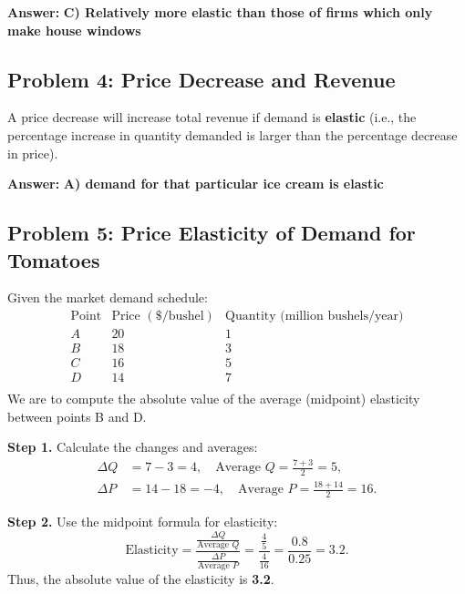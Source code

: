 \documentclass[12pt]{article}
\begin{document}
\textbf{Answer:} \textbf{C) Relatively more elastic than those of firms which only make house windows}

\subsection*{Problem 4: Price Decrease and Revenue}
A price decrease will increase total revenue if demand is \textbf{elastic} (i.e., the percentage increase in quantity demanded is larger than the percentage decrease in price).

\textbf{Answer:} \textbf{A) demand for that particular ice cream is elastic}

\subsection*{Problem 5: Price Elasticity of Demand for Tomatoes}
Given the market demand schedule:
\[
    \begin{array}{c|cccc}
        \text{Point} & \text{Price }(\$/\text{bushel}) & \text{Quantity (million bushels/year)} \\\hline
        A            & 20                              & 1                                      \\
        B            & 18                              & 3                                      \\
        C            & 16                              & 5                                      \\
        D            & 14                              & 7                                      \\
    \end{array}
\]
We are to compute the absolute value of the average (midpoint) elasticity between points B and D.

\textbf{Step 1.} Calculate the changes and averages:
\begin{align*}
    \Delta Q & = 7 - 3 = 4, \quad \text{Average } Q = \frac{7 + 3}{2} = 5,       \\
    \Delta P & = 14 - 18 = -4, \quad \text{Average } P = \frac{18 + 14}{2} = 16.
\end{align*}

\textbf{Step 2.} Use the midpoint formula for elasticity:
\[
    \text{Elasticity} = \frac{\frac{\Delta Q}{\text{Average } Q}}{\frac{\Delta P}{\text{Average } P}} = \frac{\frac{4}{5}}{\frac{4}{16}} = \frac{0.8}{0.25} = 3.2.
\]
Thus, the absolute value of the elasticity is \textbf{3.2}.
\end{document}
